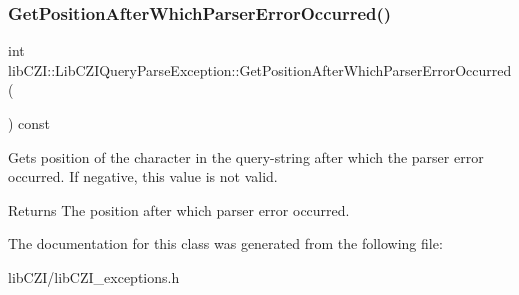 \subsubsection{\texorpdfstring{Get\+Position\+After\+Which\+Parser\+Error\+Occurred()}{GetPositionAfterWhichParserErrorOccurred()}}
{\footnotesize\ttfamily int lib\+C\+Z\+I\+::\+Lib\+C\+Z\+I\+Query\+Parse\+Exception\+::\+Get\+Position\+After\+Which\+Parser\+Error\+Occurred (\begin{DoxyParamCaption}{ }\end{DoxyParamCaption}) const\hspace{0.3cm}{\ttfamily [inline]}}

Gets position of the character in the query-\/string after which the parser error occurred. If negative, this value is not valid. \begin{DoxyReturn}{Returns}
The position after which parser error occurred. 
\end{DoxyReturn}


The documentation for this class was generated from the following file\+:\begin{DoxyCompactItemize}
\item 
lib\+C\+Z\+I/lib\+C\+Z\+I\+\_\+exceptions.\+h\end{DoxyCompactItemize}
